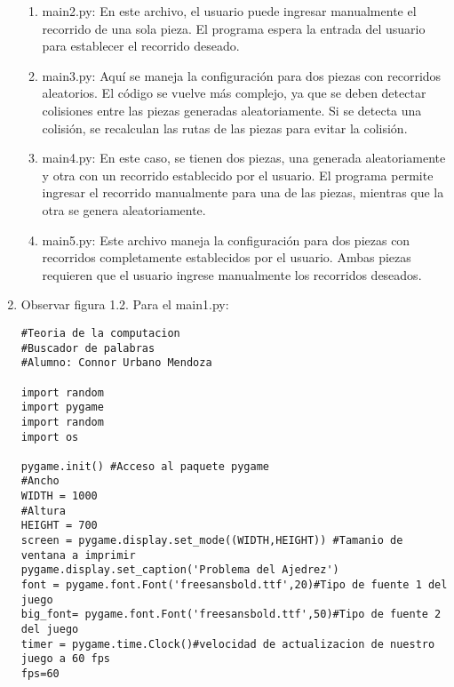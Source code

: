 \begin{enumerate}
\begin{enumerate}
    \item main2.py: En este archivo, el usuario puede ingresar manualmente el recorrido de una sola pieza. El programa espera la entrada del usuario para establecer el recorrido deseado.\newline
    
    \item main3.py: Aquí se maneja la configuración para dos piezas con recorridos aleatorios. El código se vuelve más complejo, ya que se deben detectar colisiones entre las piezas generadas aleatoriamente. Si se detecta una colisión, se recalculan las rutas de las piezas para evitar la colisión.\newline
    
    \item main4.py: En este caso, se tienen dos piezas, una generada aleatoriamente y otra con un recorrido establecido por el usuario. El programa permite ingresar el recorrido manualmente para una de las piezas, mientras que la otra se genera aleatoriamente.\newline
    
    \item main5.py: Este archivo maneja la configuración para dos piezas con recorridos completamente establecidos por el usuario. Ambas piezas requieren que el usuario ingrese manualmente los recorridos deseados.\newline
\end{enumerate}

\item Observar figura 1.2. Para el main1.py:\newline
\begin{lstlisting}
#Teoria de la computacion
#Buscador de palabras
#Alumno: Connor Urbano Mendoza

import random
import pygame
import random
import os

pygame.init() #Acceso al paquete pygame
#Ancho
WIDTH = 1000
#Altura
HEIGHT = 700
screen = pygame.display.set_mode((WIDTH,HEIGHT)) #Tamanio de ventana a imprimir
pygame.display.set_caption('Problema del Ajedrez')
font = pygame.font.Font('freesansbold.ttf',20)#Tipo de fuente 1 del juego
big_font= pygame.font.Font('freesansbold.ttf',50)#Tipo de fuente 2 del juego
timer = pygame.time.Clock()#velocidad de actualizacion de nuestro juego a 60 fps
fps=60


\end{lstlisting}
\end{enumerate}
